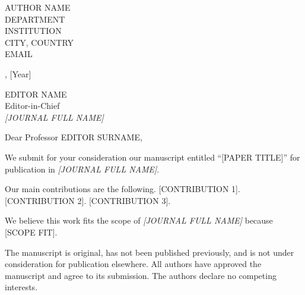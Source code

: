 \documentclass[11pt]{article}
\begin{document}
\noindent
AUTHOR NAME\\
DEPARTMENT\\
INSTITUTION\\
CITY, COUNTRY\\
EMAIL

\bigskip
\noindent
[Month] [Day], [Year]

\bigskip
\noindent
EDITOR NAME\\
Editor-in-Chief\\
\emph{[JOURNAL FULL NAME]}

\bigskip
\noindent
Dear Professor EDITOR SURNAME,


\bigskip
\noindent
We submit for your consideration our manuscript entitled ``[PAPER TITLE]'' for publication in
\emph{[JOURNAL FULL NAME]}.

\bigskip
{}

\bigskip
\noindent
Our main contributions are the following. [CONTRIBUTION 1]. [CONTRIBUTION 2]. [CONTRIBUTION 3].

\bigskip
\noindent
We believe this work fits the scope of \emph{[JOURNAL FULL NAME]} because [SCOPE FIT].

\bigskip
\noindent
The manuscript is original, has not been published previously, and is not under consideration for
publication elsewhere. All authors have approved the manuscript and agree to its submission. The
authors declare no competing interests.


\end{document}
